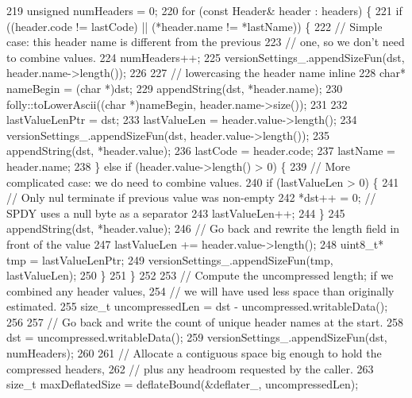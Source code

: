 \begin{DoxyCode}
219   \textcolor{keywordtype}{unsigned} numHeaders = 0;
220   \textcolor{keywordflow}{for} (\textcolor{keyword}{const} Header& header : headers) \{
221     \textcolor{keywordflow}{if} ((header.code != lastCode) || (*header.name != *lastName)) \{
222       \textcolor{comment}{// Simple case: this header name is different from the previous}
223       \textcolor{comment}{// one, so we don't need to combine values.}
224       numHeaders++;
225       versionSettings_.appendSizeFun(dst, header.name->length());
226 
227       \textcolor{comment}{// lowercasing the header name inline}
228       \textcolor{keywordtype}{char}* nameBegin = (\textcolor{keywordtype}{char} *)dst;
229       appendString(dst, *header.name);
230       folly::toLowerAscii((\textcolor{keywordtype}{char} *)nameBegin, header.name->size());
231 
232       lastValueLenPtr = dst;
233       lastValueLen = header.value->length();
234       versionSettings_.appendSizeFun(dst, header.value->length());
235       appendString(dst, *header.value);
236       lastCode = header.code;
237       lastName = header.name;
238     \} \textcolor{keywordflow}{else} \textcolor{keywordflow}{if} (header.value->length() > 0) \{
239       \textcolor{comment}{// More complicated case: we do need to combine values.}
240       \textcolor{keywordflow}{if} (lastValueLen > 0) \{
241         \textcolor{comment}{// Only nul terminate if previous value was non-empty}
242         *dst++ = 0;  \textcolor{comment}{// SPDY uses a null byte as a separator}
243         lastValueLen++;
244       \}
245       appendString(dst, *header.value);
246       \textcolor{comment}{// Go back and rewrite the length field in front of the value}
247       lastValueLen += header.value->length();
248       uint8\_t* tmp = lastValueLenPtr;
249       versionSettings_.appendSizeFun(tmp, lastValueLen);
250     \}
251   \}
252 
253   \textcolor{comment}{// Compute the uncompressed length; if we combined any header values,}
254   \textcolor{comment}{// we will have used less space than originally estimated.}
255   \textcolor{keywordtype}{size\_t} uncompressedLen = dst - uncompressed.writableData();
256 
257   \textcolor{comment}{// Go back and write the count of unique header names at the start.}
258   dst = uncompressed.writableData();
259   versionSettings_.appendSizeFun(dst, numHeaders);
260 
261   \textcolor{comment}{// Allocate a contiguous space big enough to hold the compressed headers,}
262   \textcolor{comment}{// plus any headroom requested by the caller.}
263   \textcolor{keywordtype}{size\_t} maxDeflatedSize = deflateBound(&deflater_, uncompressedLen);

\end{DoxyCode}
